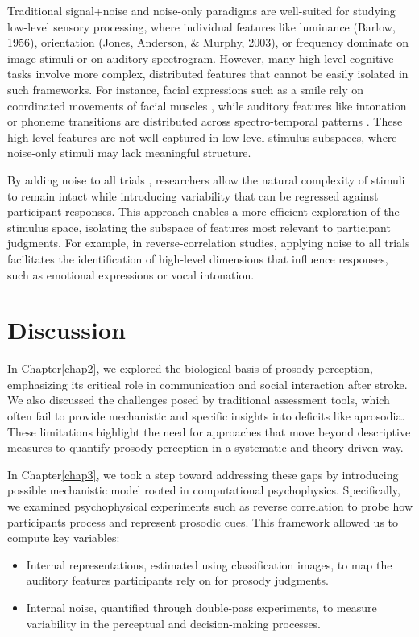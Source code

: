 Traditional signal+noise and noise-only paradigms are well-suited for studying low-level sensory processing, where individual features like luminance  (Barlow, 1956), orientation  (Jones, Anderson, \& Murphy, 2003), or frequency dominate on image stimuli \cite{dotsch_reverse_2012} or on auditory spectrogram\cite{varnet_how_2015}. However, many high-level cognitive tasks involve more complex, distributed features that cannot be easily isolated in such frameworks. For instance, facial expressions such as a smile rely on coordinated movements of facial muscles \cite{ponsot_uncovering_2018}, while auditory features like intonation or phoneme transitions are distributed across spectro-temporal patterns \cite{ponsot_cracking_2018}. These high-level features are not well-captured in low-level stimulus subspaces, where noise-only stimuli may lack meaningful structure.

By adding noise to all trials \cite{burred_cleese_2019}, researchers allow the natural complexity of stimuli to remain intact while introducing variability that can be regressed against participant responses. This approach enables a more efficient exploration of the stimulus space, isolating the subspace of features most relevant to participant judgments. For example, in reverse-correlation studies, applying noise to all trials facilitates the identification of high-level dimensions that influence responses, such as emotional expressions or vocal intonation.

\section {Discussion} 

In Chapter\ref{chap2}, we explored the biological basis of prosody perception, emphasizing its critical role in communication and social interaction after stroke. We also discussed the challenges posed by traditional assessment tools, which often fail to provide mechanistic and specific insights into deficits like aprosodia. These limitations highlight the need for approaches that move beyond descriptive measures to quantify prosody perception in a systematic and theory-driven way.

In Chapter\ref{chap3}, we took a step toward addressing these gaps by introducing possible mechanistic model rooted in computational psychophysics. Specifically, we examined psychophysical experiments such as reverse correlation to probe how participants process and represent prosodic cues. This framework allowed us to compute key variables:
\begin{itemize}
    \item Internal representations, estimated using classification images, to map the auditory features participants rely on for prosody judgments.
    \item Internal noise, quantified through double-pass experiments, to measure variability in the perceptual and decision-making processes.
\end{itemize}

